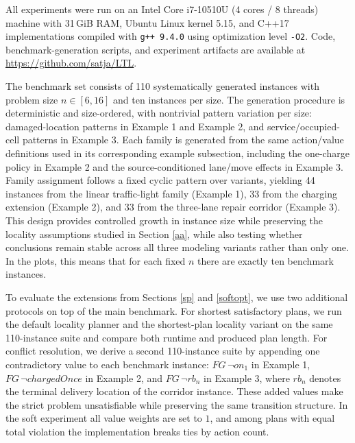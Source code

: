 \documentclass[]{jair}
\begin{document}
All experiments were run on an Intel Core i7-10510U (4 cores / 8 threads) machine with 31\,GiB RAM, Ubuntu Linux kernel 5.15, and C++17 implementations compiled with \texttt{g++ 9.4.0} using optimization level \texttt{-O2}.
Code, benchmark-generation scripts, and experiment artifacts are available at \url{https://github.com/satja/LTL}.

The benchmark set consists of 110 systematically generated instances with problem size $n\in[6,16]$ and ten instances per size. The generation procedure is deterministic and size-ordered, with nontrivial pattern variation per size: damaged-location patterns in Example 1 and Example 2, and service/occupied-cell patterns in Example 3. Each family is generated from the same action/value definitions used in its corresponding example subsection, including the one-charge policy in Example 2 and the source-conditioned lane/move effects in Example 3. Family assignment follows a fixed cyclic pattern over variants, yielding 44 instances from the linear traffic-light family (Example 1), 33 from the charging extension (Example 2), and 33 from the three-lane repair corridor (Example 3). This design provides controlled growth in instance size while preserving the locality assumptions studied in Section \ref{aa}, while also testing whether conclusions remain stable across all three modeling variants rather than only one. In the plots, this means that for each fixed $n$ there are exactly ten benchmark instances.

To evaluate the extensions from Sections \ref{sp} and \ref{softopt}, we use two additional protocols on top of the main benchmark. For shortest satisfactory plans, we run the default locality planner and the shortest-plan locality variant on the same 110-instance suite and compare both runtime and produced plan length. For conflict resolution, we derive a second 110-instance suite by appending one contradictory value to each benchmark instance: $FG\,\neg on_1$ in Example 1, $FG\,\neg chargedOnce$ in Example 2, and $FG\,\neg rb_n$ in Example 3, where $rb_n$ denotes the terminal delivery location of the corridor instance. These added values make the strict problem unsatisfiable while preserving the same transition structure. In the soft experiment all value weights are set to $1$, and among plans with equal total violation the implementation breaks ties by action count.
\end{document}
